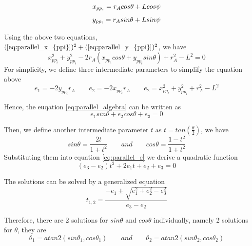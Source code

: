 \documentclass{article}
\begin{document}
\begin{equation}
\label{eq:parallel_x_{ppi}}
x_{pp_i} = r_Acos\theta+Lcos\psi
\end{equation}
\begin{equation}
\label{eq:parallel_y_{ppi}}
y_{pp_i} = r_Asin\theta+Lsin\psi
\end{equation}

Using the above two equations, $(\ref{eq:parallel_x_{ppi}})^2 + (\ref{eq:parallel_y_{ppi}})^2 $, we have
\begin{equation}
\label{eq:parallel_algebra}
x_{pp_i}^2 + y_{pp_i}^2 - 2r_A(x_{pp_i}cos\theta+y_{pp_i}sin\theta)+r_A^2-L^2 = 0
\end{equation}
For simplicity, we define three intermediate parameters to simplify the equation above
\begin{equation}
e_1 = -2y_{pp_i}r_A
\qquad
e_2 = -2x_{pp_i}r_A
\qquad
e_2 =x_{pp_i}^2+y_{pp_i}^2+r_A^2-L^2
\end{equation}

Hence, the euqation \ref{eq:parallel_algebra} can be written as
\begin{equation}
\label{eq:parallel_e}
e_1sin\theta + e_2cos\theta + e_3 = 0
\end{equation}

Then, we define another intermediate parameter $t$ as $t=tan(\frac{\theta}{2})$, we have
\begin{equation}
sin\theta=\frac{2t}{1+t^2}\qquad and \qquad cos\theta=\frac{1-t^2}{1+t^2}
\end{equation}
Substituting them into equation \ref{eq:parallel_e} we derive a quadratic function 
\begin{equation}
(e_3-e_2)t^2+2e_1t+e_2+e_3=0
\end{equation}

The solutions can be solved by a generalized equation
\begin{equation}
\label{eq:parallel_t}
t_{1,2}=\frac{-e_1\pm\sqrt{e_1^2+e_2^2-e_3^2}}{e_3-e_2}
\end{equation}

Therefore, there are 2 solutions for $sin\theta$ and $cos\theta$ individually, namely 2 solutions for $\theta$, they are
\begin{equation}
\theta_1 = atan2(sin\theta_1,cos\theta_1)\qquad and \qquad \theta_2 = atan2(sin\theta_2,cos\theta_2)
\end{equation}
\end{document}

